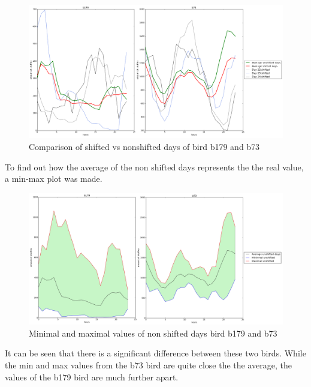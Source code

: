 \documentclass[a4paper]{article}
\begin{document}
\begin{figure}[H]
  \centering
    \includegraphics[width=1\textwidth]{b179_b73_merged}
      \caption{Comparison of shifted vs nonshifted days of bird b179 and b73}
\end{figure}

To find out how the average of the non shifted days represents the the real value, a min-max plot was made.
\begin{figure}[H]
  \centering
    \includegraphics[width=1\textwidth]{b179_b73_merged_surface}
      \caption{Minimal and maximal values of non shifted days bird b179 and b73}
\end{figure}
It can be seen that there is a significant difference between these two birds. While the min and max values from the b73 bird are quite close the the average, the values of the b179 bird are much further apart.
\end{document}
